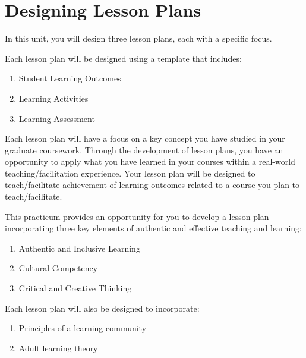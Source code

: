 \documentclass[
]{book}
\providecommand{\tightlist}{%
  \setlength{\itemsep}{0pt}\setlength{\parskip}{0pt}}
\begin{document}
\hypertarget{designing-lesson-plans}{%
\section{Designing Lesson Plans}\label{designing-lesson-plans}}

In this unit, you will design three lesson plans, each with a specific focus.

Each lesson plan will be designed using a template that includes:

\begin{enumerate}
\def\labelenumi{\arabic{enumi}.}
\tightlist
\item
  Student Learning Outcomes\\
\item
  Learning Activities\\
\item
  Learning Assessment
\end{enumerate}

Each lesson plan will have a focus on a key concept you have studied in your graduate coursework. Through the development of lesson plans, you have an opportunity to apply what you have learned in your courses within a real-world teaching/facilitation experience. Your lesson plan will be designed to teach/facilitate achievement of learning outcomes related to a course you plan to teach/facilitate.

This practicum provides an opportunity for you to develop a lesson plan incorporating three key elements of authentic and effective teaching and learning:

\begin{enumerate}
\def\labelenumi{\arabic{enumi}.}
\tightlist
\item
  Authentic and Inclusive Learning\\
\item
  Cultural Competency\\
\item
  Critical and Creative Thinking
\end{enumerate}

Each lesson plan will also be designed to incorporate:

\begin{enumerate}
\def\labelenumi{\arabic{enumi}.}
\tightlist
\item
  Principles of a learning community\\
\item
  Adult learning theory
\end{enumerate}
\end{document}
